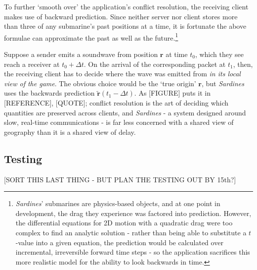 \documentclass[a4paper, 10pt]{article}
\begin{document}
\begin{flushleft}
\vspace{5pt}\noindent
To further `smooth over' the application's conflict resolution, the receiving client makes use of backward prediction. Since neither server nor client stores more than three of any submarine's past positions at a time, it is fortunate the above formulae can approximate the past as well as the future.\footnote{\textit{Sardines}' submarines are physics-based objects, and at one point in development, the drag they experience was factored into prediction. However, the differential equations for 2D motion with a quadratic drag were too complex to find an analytic solution - rather than being able to substitute a $t$-value into a given equation, the prediction would be calculated over incremental, irreversible forward time steps - so the application sacrifices this more realistic model for the ability to look backwards in time.}

\vspace{5pt}\noindent
Suppose a sender emits a soundwave from position $\mathbf{r}$ at time $t_0$, which they see reach a receiver at $t_0+\Delta t$. On the arrival of the corresponding packet at $t_1$, then, the receiving client has to decide where the wave was emitted from \textit{in its local view of the game}. The obvious choice would be the `true origin' $\mathbf{r}$, but \textit{Sardines} uses the backwards prediction $\mathbf{\tilde{r}}(t_1-\Delta t)$. As [FIGURE] puts it in [REFERENCE], [QUOTE]; conflict resolution is the art of deciding which quantities are preserved across clients, and \textit{Sardines} - a system designed around slow, real-time communications - is far less concerned with a shared view of geography than it is a shared view of delay.

\subsection*{Testing}

[SORT THIS LAST THING - BUT PLAN THE TESTING OUT BY 15th?]



\end{flushleft}
\end{document}
